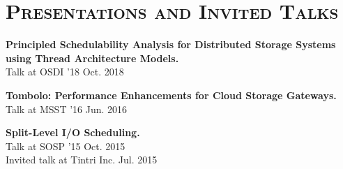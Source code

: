 \documentclass[10pt, letterpaper]{article}
\renewenvironment{itemize}{
  \begin{list}{}{
    \setlength{\leftmargin}{1.2em}
    \setlength{\itemsep}{0.12em}
    \setlength{\parskip}{0pt}
    \setlength{\parsep}{0.12em}
  }
}{
  \end{list}
}
\begin{document}
\section*{\textsc{Presentations and Invited Talks}}
\begin{itemize}
       \item {\bf{Principled Schedulability Analysis for Distributed Storage Systems using Thread Architecture Models.}} \\
        {\small{Talk at OSDI '18}} \hfill Oct. 2018

       \item {\bf{Tombolo: Performance Enhancements for Cloud Storage Gateways.}} \\
        {\small{Talk at MSST '16}}  \hfill Jun. 2016
       
       \item {\bf{Split-Level I/O Scheduling.}} \\
        {\small{Talk at SOSP '15}}  \hfill Oct. 2015\\
	{\small{Invited talk at Tintri Inc.}}	   \hfill Jul. 2015
\end{itemize}

\end{document}
